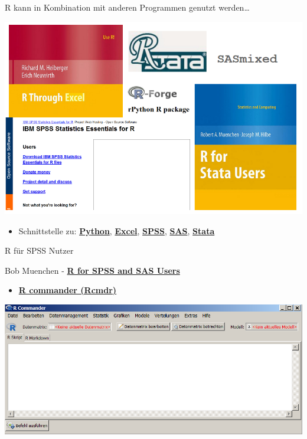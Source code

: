 \documentclass[ignorenonframetext,]{beamer}
\providecommand{\tightlist}{%
  \setlength{\itemsep}{0pt}\setlength{\parskip}{0pt}}
\begin{document}
\begin{frame}{R kann in Kombination mit anderen Programmen genutzt
werden\ldots{}}

\includegraphics{figure/Rinterfaces.PNG}

\begin{itemize}
\tightlist
\item
  Schnittstelle zu:
  \href{https://cran.r-project.org/web/packages/reticulate/vignettes/calling_python.html}{\textbf{Python}},
  \href{https://www.springer.com/de/book/9781441900517}{\textbf{Excel}},
  \href{https://www.ibm.com/support/knowledgecenter/en/SSFUEU_7.2.0/com.ibm.swg.ba.cognos.op_capmod_ig.7.2.0.doc/t_essentials_for_r_statistics.html}{\textbf{SPSS}},
  \href{https://cran.r-project.org/web/packages/SASmixed/index.html}{\textbf{SAS}},
  \href{https://cran.r-project.org/web/packages/RStata/index.html}{\textbf{Stata}}
\end{itemize}

\end{frame}

\begin{frame}{R für SPSS Nutzer}

\begin{block}{Bob Muenchen -
\href{https://science.nature.nps.gov/im/datamgmt/statistics/r/documents/r_for_sas_spss_users.pdf}{\textbf{R
for SPSS and SAS Users }}}

\begin{itemize}
\tightlist
\item
  \href{http://www.rcommander.com/}{\textbf{R commander (Rcmdr)}}
\end{itemize}

\includegraphics{figure/Rcommanderex.PNG}

\end{block}

\end{frame}
\end{document}
